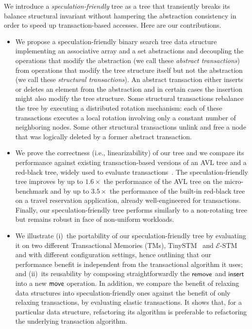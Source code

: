 We introduce a \emph{speculation-friendly} tree as a tree that transiently breaks its
balance structural invariant without hampering the abstraction consistency in order to speed up transaction-based accesses. 
Here are our contributions.

\begin{itemize}
\item We propose a speculation-friendly binary search tree data structure
implementing an associative array and a set abstractions and decoupling
the operations that modify the abstraction (we call these \emph{abstract transactions}) from operations
that modify the tree structure itself but not the abstraction (we call these \emph{structural transactions}).
An abstract transaction either inserts or deletes an element from the abstraction and 
in certain cases the insertion might also modify the tree structure.
Some structural transactions rebalance the tree 
by executing a distributed rotation mechanism: each of these transactions executes a local rotation involving
only a constant number of neighboring nodes. 
Some other structural transactions unlink and free a node that was logically deleted 
by a former abstract transaction.

\item We prove the correctness (i.e., linearizability) of our tree and we compare its performance against existing transaction-based versions of an AVL tree and a red-black tree,
widely used to evaluate transactions~\cite{DSS06,HLMS03,CCKO08,HK08,FFR08,YNW+08,DFGG11}.
The speculation-friendly tree improves by up to $1.6\times$ the performance of the AVL tree on the micro-benchmark and 
by up to $3.5\times$ the performance of the built-in red-black tree on a travel reservation application, already well-engineered for transactions.
Finally, our speculation-friendly tree performs similarly to a non-rotating tree but remains robust in face of non-uniform workloads.

\item We illustrate (i)~the portability of our speculation-friendly tree by evaluating it on two different Transactional Memories (TMs), TinySTM~\cite{FFR08} 
and $\mathcal{E}$-STM~\cite{FGG09} and with different configuration settings, hence outlining that our performance benefit is independent 
from the transactional algorithm it uses; and (ii)~its reusability by composing 
straightforwardly the $\lit{remove}$ and $\lit{insert}$ into a new $\lit{move}$ operation.
In addition, we compare the benefit of relaxing data structures into speculation-friendly ones against the benefit of only relaxing transactions,
by evaluating elastic transactions.
It shows that, for a particular data structure, refactoring its algorithm is preferable to refactoring the underlying transaction algorithm.
\end{itemize}

